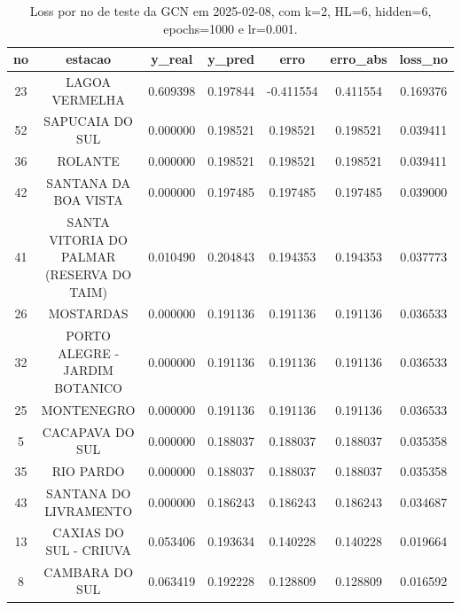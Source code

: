 \begin{table}[h]
\centering
\caption{Loss por no de teste da GCN em 2025-02-08, com k=2, HL=6, hidden=6, epochs=1000 e lr=0.001.}
\label{tab:gcn_loss_k2_hl6_h6_e1000_d20250208}
\begin{tabular}{ccccccc}
\toprule
no & estacao & y\_real & y\_pred & erro & erro\_abs & loss\_no \\
\midrule
23 & LAGOA VERMELHA & 0.609398 & 0.197844 & -0.411554 & 0.411554 & 0.169376 \\
52 & SAPUCAIA DO SUL & 0.000000 & 0.198521 & 0.198521 & 0.198521 & 0.039411 \\
36 & ROLANTE & 0.000000 & 0.198521 & 0.198521 & 0.198521 & 0.039411 \\
42 & SANTANA DA BOA VISTA & 0.000000 & 0.197485 & 0.197485 & 0.197485 & 0.039000 \\
41 & SANTA VITORIA DO PALMAR (RESERVA DO TAIM) & 0.010490 & 0.204843 & 0.194353 & 0.194353 & 0.037773 \\
26 & MOSTARDAS & 0.000000 & 0.191136 & 0.191136 & 0.191136 & 0.036533 \\
32 & PORTO ALEGRE - JARDIM BOTANICO & 0.000000 & 0.191136 & 0.191136 & 0.191136 & 0.036533 \\
25 & MONTENEGRO & 0.000000 & 0.191136 & 0.191136 & 0.191136 & 0.036533 \\
5 & CACAPAVA DO SUL & 0.000000 & 0.188037 & 0.188037 & 0.188037 & 0.035358 \\
35 & RIO PARDO & 0.000000 & 0.188037 & 0.188037 & 0.188037 & 0.035358 \\
43 & SANTANA DO LIVRAMENTO & 0.000000 & 0.186243 & 0.186243 & 0.186243 & 0.034687 \\
13 & CAXIAS DO SUL - CRIUVA & 0.053406 & 0.193634 & 0.140228 & 0.140228 & 0.019664 \\
8 & CAMBARA DO SUL & 0.063419 & 0.192228 & 0.128809 & 0.128809 & 0.016592 \\
\bottomrule
\end{tabular}
\end{table}
